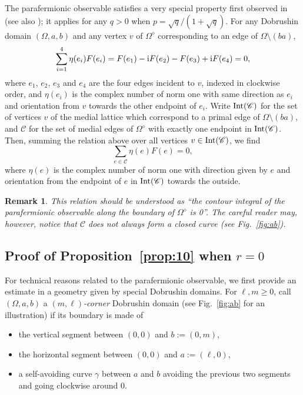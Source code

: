 \documentclass[a4paper,oneside,11pt]{article}
\newtheorem{remark}[theorem]{Remark}
\numberwithin{equation}{section}
\numberwithin{equation}{section}
\numberwithin{equation}{section}
\newcommand{\calC}{\mathcal{C}}
\newcommand{\Int}{{\rm Int}}
\begin{document}
The parafermionic observable satisfies a very special property first observed in \cite{Smi10} (see also \cite[Thm.~5.16]{Dum17a}); 
it applies for any  $q>0$ when $p=\sqrt q /(1 + \sqrt q)$. 
For any Dobrushin domain $(\Omega,a,b)$ and any vertex $v$ of $\Omega^\diamond$ corresponding to an edge of $\Omega \setminus (ba)$,
\begin{equation}\label{rel_vertex}
	\sum_{i=1}^4 \eta(e_i) F(e_i) = F(e_1) - {\rm i}F(e_2) - F(e_3) + {\rm i}F(e_4) = 0,
\end{equation}
where $e_1$, $e_2$, $e_3$ and $e_4$ are the four edges incident to $v$, indexed in clockwise order,
and $\eta(e_i)$ is the complex number of norm one with same direction as $e_i$ and orientation from $v$ towards the other endpoint of $e_i$.
Write $\Int(\calC)$ for the set of vertices $v$ of the medial lattice which correspond to a primal edge of $\Omega \setminus (ba)$,
and $\calC$ for the set of medial edges of $\Omega^\diamond$ with exactly one endpoint in $\Int(\calC)$. 
Then, summing the relation above over all vertices $v \in \Int(\calC)$, we find
\begin{equation}\label{eq:rel_vertex}
	\sum_{e\in \calC}\eta(e)F(e)=0,
\end{equation}
where $\eta(e)$ is the complex number of norm one with direction given by $e$ and orientation from the endpoint of $e$ in $\Int(\calC)$ towards the outside. 

\begin{remark}
This relation should be understood as ``the contour integral of the parafermionic observable along the boundary of $\Omega^\diamond$ is 0''.
The careful reader may, however, notice that $\calC$ does not always form a closed curve (see Fig.~\ref{fig:ab}).
\end{remark}

\subsection{Proof of Proposition~\ref{prop:10} when $r=0$}\label{sec:r=0}

For technical reasons related to the parafermionic observable, we first provide an estimate in a geometry given by special Dobrushin domains. For $\ell,m\ge0$, call $(\Omega,a,b)$ a {\em $(m,\ell)$-corner} Dobrushin domain (see Fig.~\ref{fig:ab} for an illustration) if its boundary is made of 
\begin{itemize}[noitemsep]
\item the vertical segment between $(0,0)$ and $b:=(0,m)$,
\item the horizontal segment between $(0,0)$ and $a:=(\ell,0)$,
\item a self-avoiding curve $\gamma$ between $a$ and $b$ avoiding the previous two segments and going clockwise around $0$. 
\end{itemize}
\end{document}
